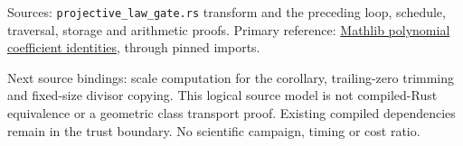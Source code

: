 \documentclass[10pt]{article}
\begin{document}
Sources: \texttt{projective\_law\_gate.rs} transform and the preceding loop, schedule, traversal, storage and arithmetic proofs. Primary reference: \href{https://leanprover-community.github.io/mathlib4_docs/Mathlib/Algebra/Polynomial/Coeff.html}{Mathlib polynomial coefficient identities}, through pinned imports.

Next source bindings: scale computation for the corollary, trailing-zero trimming and fixed-size divisor copying. This logical source model is not compiled-Rust equivalence or a geometric class transport proof. Existing compiled dependencies remain in the trust boundary. No scientific campaign, timing or cost ratio.
\end{document}

